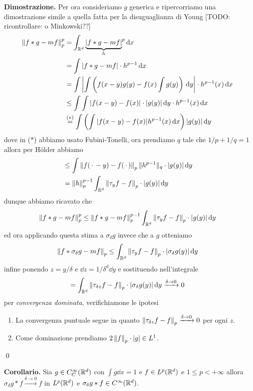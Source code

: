 \documentclass[a4paper, 12pt]{report}
\begin{document}
\textbf{Dimostrazione.}
Per ora consideriamo $g$ generica e ripercorriamo una dimostrazione simile a quella fatta per la disuguaglianza di Young [TODO: ricontrollare: o Minkowski??]
$$
\begin{aligned}
	\left\lVert f \ast g - m f \right\rVert_p^p 
	&= \int_{\mathbb R^d} {\underbrace{|f \ast g - m f|}_h}^p \,\mathrm{d} x \\
	&= \int |f \ast g - m f| \cdot h^{p-1} \,\mathrm{d} x \\
	&= \int \left| \int \left( f(x - y) g(y) - f(x) \int g(y) \right) \,\mathrm{d} y \right| \cdot h^{p-1}(x) \,\mathrm{d} x \\
	&\leq \int \int |f(x - y) - f(x)| \cdot |g(y)| \,\mathrm{d} y \cdot h^{p-1}(x) \,\mathrm{d} x \\
	&\overset{\text{($*$)}}{=} \int \left(\int |f(x - y) - f(x)| h^{p-1}(x) \,\mathrm{d} x \right) |g(y)| \,\mathrm{d} y
\end{aligned}
$$
dove in ($*$) abbiamo usato Fubini-Tonelli, ora prendiamo $q$ tale che $1/p + 1/q = 1$ allora per H\"older abbiamo
$$
\begin{aligned}
	&\leq \int \left\lVert f(\,\cdot\, - y) - f(\,\cdot\,) \right\rVert_p \| h^{p-1} \|_q \cdot |g(y)| \,\mathrm{d} y \\
	&= \left\lVert h \right\rVert_p^{p-1} \int_{\mathbb R^d} \left\lVert \tau_y f - f \right\rVert_p \cdot |g(y)| \,\mathrm{d} y \\
\end{aligned}
$$
dunque abbiamo ricavato che
$$
\left\lVert f \ast g - m f \right\rVert_p^p 
\leq \left\lVert f \ast g - m f \right\rVert_p^{p-1} \int_{\mathbb R^d} \left\lVert \tau_y f - f \right\rVert_p \cdot |g(y)| \,\mathrm{d} y
$$
ed ora applicando questa stima a $\sigma_\delta g$ invece che a $g$ otteniamo
$$
\left\lVert f \ast \sigma_\delta g - m f \right\rVert_p
\leq \int_{\mathbb R^d} \left\lVert \tau_y f - f \right\rVert_p \cdot |\sigma_\delta g(y)| \,\mathrm{d} y
$$
infine ponendo $z = y / \delta$ e $\dd z = 1/\delta^d \dd y$ e sostituendo nell'integrale
$$
= \int_{\mathbb R^d} \left\lVert \tau_{\delta z} f - f \right\rVert_p \cdot |\sigma_\delta g(y)| \,\mathrm{d} y \xrightarrow{\delta \to 0} 0
$$
per \textit{convergenza dominata}, verifichiamone le ipotesi
\begin{enumerate}
	\item La convergenza puntuale segue in quanto $\left\lVert \tau_{\delta z} f - f \right\rVert_p \xrightarrow{\delta \to 0} 0$ per ogni $z$.
	\item Come dominazione prendiamo $2 \left\lVert f \right\rVert_p \cdot |g| \in L^1$.
\end{enumerate}
\qed

\textbf{Corollario.}
Sia $g \in C_C^\infty(\mathbb R^d)$ con $\int g \dd x = 1$ e $f \in L^p(\mathbb R^d)$ e $1 \leq p < +\infty$ allora $\sigma_\delta g \ast f \xrightarrow{\delta \to 0} f$ in $L^p(\mathbb R^d)$ e $\sigma_\delta g \ast f \in C^\infty(\mathbb R^d)$.
\end{document}
